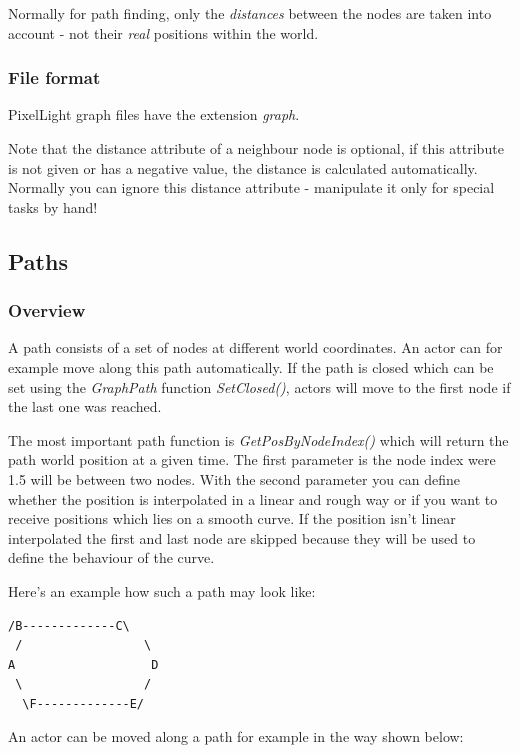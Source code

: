 Normally for path finding, only the \emph{distances} between the nodes are taken into account - not their \emph{real} positions within the world.



\subsubsection{File format}
PixelLight graph files have the extension \emph{graph}.

Note that the distance attribute of a neighbour node is optional, if this attribute is not given or has a negative value, the distance is calculated automatically. Normally you can ignore this distance attribute - manipulate it only for special tasks by hand!




\subsection{Paths}



\subsubsection{Overview}
A path consists of a set of nodes at different world coordinates. An actor can for example move along this path automatically. If the path is closed which can be set using the \emph{GraphPath} function \emph{SetClosed()}, actors will move to the first node if the last one was reached.

The most important path function is \emph{GetPosByNodeIndex()} which will return the path world position at a given time. The first parameter is the node index were 1.5 will be between two nodes. With the second parameter you can define whether the position is interpolated in a linear and rough way or if you want to receive positions which lies on a smooth curve. If the position isn't linear interpolated the first and last node are skipped because they will be used to define the behaviour of the curve.

Here's an example how such a path may look like:

\begin{lstlisting}[caption=Path example]
  /B-------------C\
 /                 \
A                   D
 \                 /
  \F-------------E/
\end{lstlisting}

An actor can be moved along a path for example in the way shown below:

